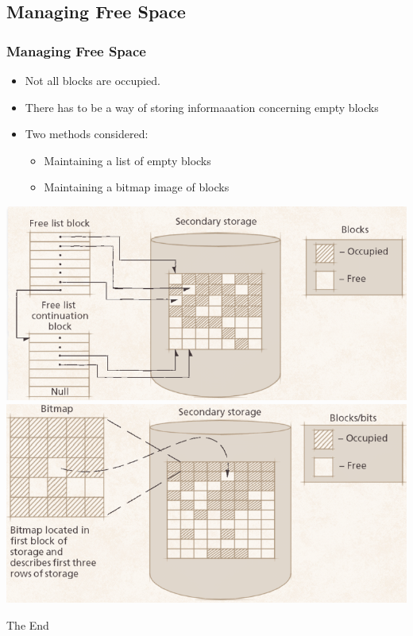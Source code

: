 \documentclass{beamer}
\begin{document}
\subsection{Managing Free Space}
\begin{frame}
\frametitle{Managing Free Space}
\begin{itemize}
\item Not all blocks are occupied.
\item There has to be a way of storing informaaation concerning empty blocks
\item Two methods considered:
\begin{itemize}
\item Maintaining a list of empty blocks
\item Maintaining a bitmap image of blocks
\end{itemize}
\end{itemize}
\includegraphics[scale=0.225]{flist.png}
\includegraphics[scale=0.225]{fbit.png}
\end{frame}

\begin{frame} 
\Huge{\centerline{The End}}
\end{frame}
\end{document}
